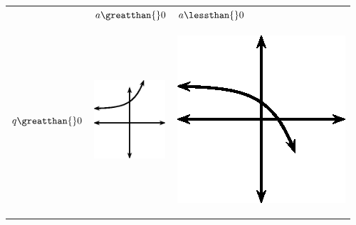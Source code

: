 \begin{center}
\label{m39348*uid186}
\noindent
{}
\tablelasttail{}
\begin{xtabular*}{\mytablewidth}[t]{|p{10\mystarwidth}|p{10\mystarwidth}|p{10\mystarwidth}|}\hline
&
    $a\greatthan{}0$
    &
    $a\lessthan{}0$
\tabularnewline{}
    $q\greatthan{}0$
    &
\setcounter{subfigure}{0}
\label{m39348*id250546}
\begin{center}
\label{m39348*id250546!!!underscore!!!media}\label{m39348*id250546!!!underscore!!!printimage}\includegraphics[width=100px]{col11306.imgs/m39348_MG10C11_028.png} %
\vspace{2pt}
\vspace{.1in}
\end{center}    
    &
\setcounter{subfigure}{0}
\label{m39348*id250558}
\begin{center}
\label{m39348*id250558!!!underscore!!!media}\label{m39348*id250558!!!underscore!!!printimage}\includegraphics[width100px]{col11306.imgs/m39348_MG10C11_029.png} %

\end{center}
\end{xtabular*}
\end{center}
